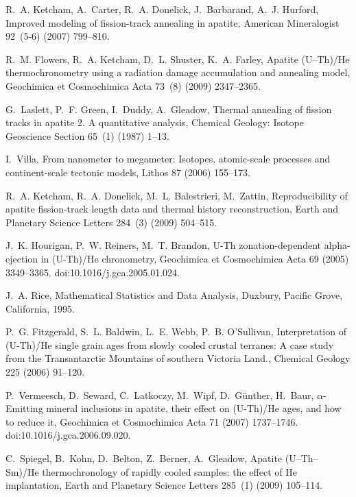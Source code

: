 \documentclass{article}
\begin{document}
\begin{thebibliography}{26}
R.~A. Ketcham, A.~Carter, R.~A. Donelick, J.~Barbarand, A.~J. Hurford, Improved
  modeling of fission-track annealing in apatite, American Mineralogist
  92~(5-6) (2007) 799--810.

R.~M. Flowers, R.~A. Ketcham, D.~L. Shuster, K.~A. Farley, {Apatite (U--Th)/He
  thermochronometry using a radiation damage accumulation and annealing model},
  Geochimica et Cosmochimica Acta 73~(8) (2009) 2347--2365.

G.~Laslett, P.~F. Green, I.~Duddy, A.~Gleadow, {Thermal annealing of fission
  tracks in apatite 2. A quantitative analysis}, Chemical Geology: Isotope
  Geoscience Section 65~(1) (1987) 1--13.

I.~Villa, From nanometer to megameter: {I}sotopes, atomic-scale processes and
  continent-scale tectonic models, Lithos 87 (2006) 155--173.

R.~A. Ketcham, R.~A. Donelick, M.~L. Balestrieri, M.~Zattin, Reproducibility of
  apatite fission-track length data and thermal history reconstruction, Earth
  and Planetary Science Letters 284~(3) (2009) 504--515.

J.~K. {Hourigan}, P.~W. {Reiners}, M.~T. {Brandon}, {U-Th zonation-dependent
  alpha-ejection in (U-Th)/He chronometry}, Geochimica et Cosmochimica Acta 69
  (2005) 3349--3365. doi:10.1016/j.gca.2005.01.024.

J.~A. Rice, Mathematical Statistics and Data Analysis, Duxbury, Pacific Grove,
  California, 1995.

P.~G. Fitzgerald, S.~L. Baldwin, L.~E. Webb, P.~B. O'Sullivan, {Interpretation
  of (U-Th)/He single grain ages from slowly cooled crustal terranes: A case
  study from the Transantarctic Mountains of southern Victoria Land.}, Chemical
  Geology 225 (2006) 91--120.

P.~{Vermeesch}, D.~{Seward}, C.~{Latkoczy}, M.~{Wipf}, D.~{G{\"u}nther},
  H.~{Baur}, {{$\alpha$}-Emitting mineral inclusions in apatite, their effect
  on (U-Th)/He ages, and how to reduce it}, Geochimica et Cosmochimica Acta 71
  (2007) 1737--1746. doi:10.1016/j.gca.2006.09.020.

C.~Spiegel, B.~Kohn, D.~Belton, Z.~Berner, A.~Gleadow, Apatite {(U--Th--Sm)/He}
  thermochronology of rapidly cooled samples: the effect of {He} implantation,
  Earth and Planetary Science Letters 285~(1) (2009) 105--114.


\end{thebibliography}
\end{document}
